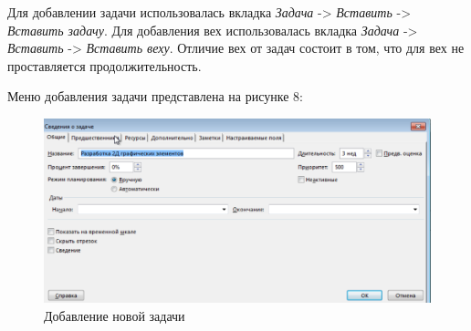 Для добавлении задачи использовалась вкладка \textit{Задача} -> \textit{Вставить} -> \textit{Вставить задачу}.
Для добавления вех использовалась вкладка \textit{Задача} -> \textit{Вставить} -> \textit{Вставить веху}.
Отличие вех от задач состоит в том, что для вех не проставляется продолжительность.

Меню добавления задачи представлена на рисунке 8:
\FloatBarrier
\begin{figure}[h]	
	\begin{center}
		\includegraphics[width=\linewidth]{inc/2-1.png}
	\end{center}
	\captionsetup{justification=centering}
	\caption{Добавление новой задачи}
\end{figure}
\FloatBarrier

\newpage


